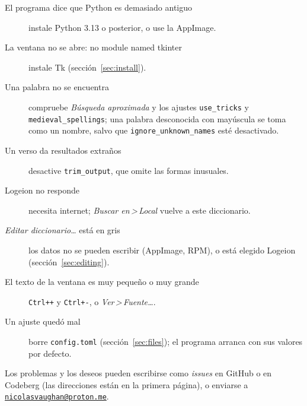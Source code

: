 \documentclass[12pt,
              article,
              oneside
              ]{memoir}
\newcommand*{\menu}[1]{\textit{#1}}
\newcommand*{\then}{\,>\,}
\newcommand*{\key}[1]{\texttt{#1}}
\begin{document}
%
\begin{description}
\item[El programa dice que Python es demasiado antiguo] instale Python
  3.13 o posterior, o use la AppImage.
\item[La ventana no se abre: no module named tkinter] instale Tk
  (sección~\ref{sec:install}).
\item[Una palabra no se encuentra] compruebe \menu{Búsqueda aproximada}
  y los ajustes \texttt{use\_tricks} y \texttt{medieval\_spellings}; una
  palabra desconocida con mayúscula se toma como un nombre, salvo que
  \texttt{ignore\_unknown\_names} esté desactivado.
\item[Un verso da resultados extraños] desactive \texttt{trim\_output},
  que omite las formas inusuales.
\item[Logeion no responde] necesita internet; \menu{Buscar en\then Local}
  vuelve a este diccionario.
\item[\menu{Editar diccionario\ldots} está en gris] los datos no se pueden
  escribir (AppImage, RPM), o está elegido Logeion
  (sección~\ref{sec:editing}).
\item[El texto de la ventana es muy pequeño o muy grande] \key{Ctrl++} y
  \key{Ctrl+-}, o \menu{Ver\then Fuente\ldots}.
\item[Un ajuste quedó mal] borre \texttt{config.toml}
  (sección~\ref{sec:files}); el programa arranca con sus valores por
  defecto.
\end{description}

\noindent
Los problemas y los deseos pueden escribirse como \textit{issues} en
GitHub o en Codeberg (las direcciones están en la primera página), o
enviarse a
\href{mailto:nicolasvaughan@proton.me}{\texttt{nicolasvaughan@proton.me}}.

\printindex
\end{document}
